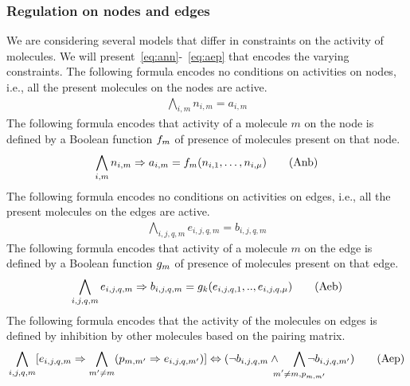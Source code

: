 



\subsubsection{Regulation on nodes and edges}
We are considering several models that differ in constraints on
the activity of molecules.
%
We will present~\eqref{eq:ann}-~\eqref{eq:aep} that encodes
the varying constraints.
%
The following formula encodes no conditions on activities on nodes,
i.e., all the present molecules on the nodes are active.
\begin{align}
\bigwedge\limits_{i,m} n_{i,m} = a_{i,m}    \tag{Ann}\label{eq:ann}
\end{align}
The following formula encodes that activity of a molecule $m$ on the node is
defined by a Boolean function $f_m$ of presence of molecules present on that node.
\begin{align}
\bigwedge\limits_{i,m} n_{i,m} \Rightarrow a_{i,m} =  f_m (n_{i,1},\dots,n_{i,\mu}) 
\tag{Anb}\label{eq:anb}
\end{align}
The following formula encodes no conditions on activities on edges,
i.e., all the present molecules on the edges are active.
\begin{align}
  \bigwedge\limits_{i,j,q,m} e_{i,j,q,m} = b_{i,j,q,m}
\tag{Aen}\label{eq:aen}
\end{align}
The following formula encodes that activity of a molecule $m$ on the edge is
defined by a Boolean function $g_m$ of presence of molecules present on that edge.
\begin{align}
   \bigwedge\limits_{i,j,q,m} e_{i,j,q,m} \Rightarrow b_{i,j,q,m} = g_k(e_{i,j,q,1}, .., e_{i,j,q,\mu} )
  \tag{Aeb}\label{eq:aeb}
\end{align}
%
The following formula encodes that the activity of the molecules on
edges is defined by inhibition by other molecules based on the pairing
matrix. 
\begin{align}
   \bigwedge\limits_{i,j,q, m}  [e_{i,j,q,m} \limplies  \bigwedge_{m' \neq m} (p_{m,m'} \limplies e_{i,j,q,m'})] \lequiv (\neg b_{i,j,q,m} \land\;\;\;\;  \bigwedge_{\mathclap{m' \neq m, p_{m,m'}}} \neg b_{i,j,q,m'})
  \tag{Aep}\label{eq:aep}
\end{align}
%
